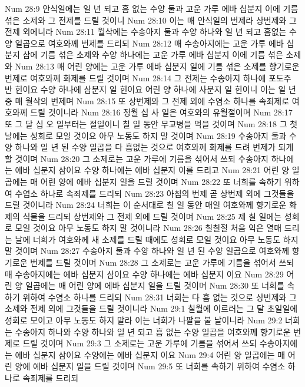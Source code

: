 Num 28:9  안식일에는 일 년 되고 흠 없는 수양 둘과 고운 가루 에바 십분지 이에 기름 섞은 소제와 그 전제를 드릴 것이니
Num 28:10  이는 매 안식일의 번제라 상번제와 그 전제 외에니라
Num 28:11  월삭에는 수송아지 둘과 수양 하나와 일 년 되고 흠없는 수양 일곱으로 여호와께 번제를 드리되
Num 28:12  매 수송아지에는 고운 가루 에바 십분지 삼에 기름 섞은 소제와 수양 하나에는 고운 가루 에바 십분지 이에 기름 섞은 소제와
Num 28:13  매 어린 양에는 고운 가루 에바 십분지 일에 기름 섞은 소제를 향기로운 번제로 여호와께 화제를 드릴 것이며
Num 28:14  그 전제는 수송아지 하나에 포도주 반 힌이요 수양 하나에 삼분지 일 힌이요 어린 양 하나에 사분지 일 힌이니 이는 일 년 중 매 월삭의 번제며
Num 28:15  또 상번제와 그 전제 외에 수염소 하나를 속죄제로 여호와께 드릴 것이니라
Num 28:16  정월 십 사 일은 여호와의 유월절이며
Num 28:17  또 그 달 십 오 일부터는 절일이니 칠 일 동안 무교병을 먹을 것이며
Num 28:18  그 첫날에는 성회로 모일 것이요 아무 노동도 하지 말 것이며
Num 28:19  수송아지 둘과 수양 하나와 일 년 된 수양 일곱을 다 흠없는 것으로 여호와께 화제를 드려 번제가 되게 할 것이며
Num 28:20  그 소제로는 고운 가루에 기름을 섞어서 쓰되 수송아지 하나에는 에바 십분지 삼이요 수양 하나에는 에바 십분지 이를 드리고
Num 28:21  어린 양 일곱에는 매 어린 양에 에바 십분지 일을 드릴 것이며
Num 28:22  또 너희를 속하기 위하여 수염소 하나로 속죄제를 드리되
Num 28:23  아침의 번제 곧 상번제 외에 그것들을 드릴 것이니라
Num 28:24  너희는 이 순서대로 칠 일 동안 매일 여호와께 향기로운 화제의 식물을 드리되 상번제와 그 전제 외에 드릴 것이며
Num 28:25  제 칠 일에는 성회로 모일 것이요 아무 노동도 하지 말 것이니라
Num 28:26  칠칠절 처음 익은 열매 드리는 날에 너희가 여호와께 새 소제를 드릴 때에도 성회로 모일 것이요 아무 노동도 하지 말 것이며
Num 28:27  수송아지 둘과 수양 하나와 일 년 된 수양 일곱으로 여호와께 향기로운 번제를 드릴 것이며
Num 28:28  그 소제로는 고운 가루에 기름을 섞어서 쓰되 매 수송아지에는 에바 십분지 삼이요 수양 하나에는 에바 십분지 이요
Num 28:29  어린 양 일곱에는 매 어린 양에 에바 십분지 일을 드릴 것이며
Num 28:30  또 너희를 속하기 위하여 수염소 하나를 드리되
Num 28:31  너희는 다 흠 없는 것으로 상번제와 그 소제와 전제 외에 그것들을 드릴 것이니라
Num 29:1  칠월에 이르러는 그 달 초일일에 성회로 모이고 아무 노동도 하지 말라 이는 너희가 나팔을 불 날이니라
Num 29:2  너희는 수송아지 하나와 수양 하나와 일 년 되고 흠 없는 수양 일곱을 여호와께 향기로운 번제로 드릴 것이며
Num 29:3  그 소제로는 고운 가루에 기름을 섞어서 쓰되 수송아지에는 에바 십분지 삼이요 수양에는 에바 십분지 이요
Num 29:4  어린 양 일곱에는 매 어린 양에 에바 십분지 일을 드릴 것이며
Num 29:5  또 너희를 속하기 위하여 수염소 하나로 속죄제를 드리되
